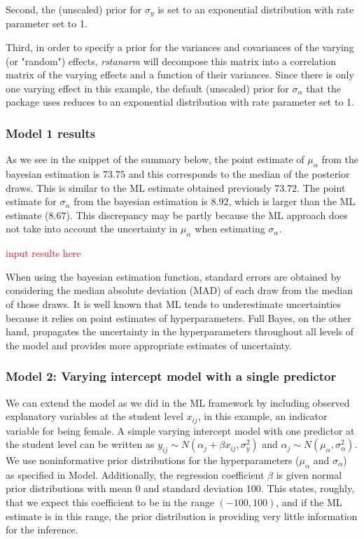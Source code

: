 Second, the (unscaled) prior for $\sigma_{y}$ is set to an exponential distribution with rate parameter set to 1.

Third, in order to specify a prior for the variances and covariances of the varying (or "random") effects, \textit{rstanarm} will decompose this matrix into a correlation matrix of the varying effects and a function of their variances.  Since there is only one varying effect in this example, the default (unscaled) prior for $\sigma_{\alpha}$ that the package uses reduces to an exponential distribution with rate parameter set to 1.

\subsubsection*{Model 1 results}  
As we see in the snippet of the summary below, the point estimate of $\mu_{\alpha}$ from the bayesian estimation is $73.75$ and this corresponds to the median of the posterior draws.  This is similar to the ML estimate obtained previously $73.72$.  The point estimate for $\sigma_{\alpha}$ from the bayesian estimation is $8.92$, which is larger than the ML estimate ($8.67$). This discrepancy may be partly because the ML approach does not take into account the uncertainty in $\mu_{\alpha}$ when estimating $\sigma_{\alpha}$.

\textcolor{red}{input results here}

When using the bayesian estimation function, standard errors are obtained by considering the median absolute deviation (MAD) of each draw from the median of those draws.  It is well known that ML tends to underestimate uncertainties because it relies on point estimates of hyperparameters. Full Bayes, on the other hand, propagates the uncertainty in the hyperparameters throughout all levels of the model and provides more appropriate estimates of uncertainty.

\subsubsection*{Model 2: Varying intercept model with a single predictor}
We can extend the model as we did in the ML framework by including observed explanatory variables at the student level $x_{ij}$, in this example, an indicator variable for being female. A simple varying intercept model with one predictor at the student level can be written as $y_{ij} \sim N(\alpha_{j} + \beta x_{ij}, \sigma_{y}^{2})$ and $\alpha_{j} \sim N(\mu_{\alpha}, \sigma_{\alpha}^{2})$. We use noninformative prior distributions for the hyperparameters ($\mu_{\alpha}$ and $\sigma_{\alpha}$) as specified in Model. Additionally, the regression coefficient $\beta$ is given normal prior distributions with mean 0 and standard deviation 100. This states, roughly, that we expect this coefficient to be in the range $(-100, 100)$, and if the ML estimate is in this range, the prior distribution is providing very little information for the inference.  


